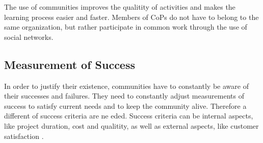 The use of communities improves the qualitity of activities and makes the learning process easier\cite{SaAr05} and faster\cite{CuZe05}. Members of CoPs do not have to belong to the same organization, but rather participate in common work through the use of social networks\cite{CuZe05}.

\subsection{Measurement of Success}
In order to justify their existence, communities have to constantly be aware of their successes and failures. They need to constantly adjust measurements of success to satisfy current needs and to keep the community alive. Therefore a different of success criteria are ne eded. Success criteria can be internal aspects, like project duration, cost and qualitity, as well as external aspects, like customer satisfaction \cite{AgRa06}.

